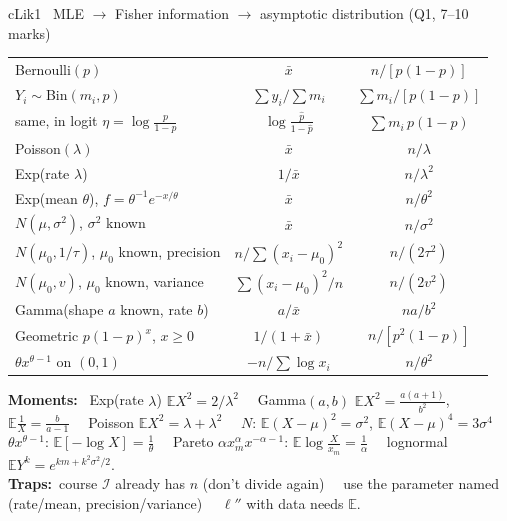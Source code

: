 \documentclass{article}
\newcommand{\h}[1]{{\bfseries #1}\ }
\newcommand{\trap}{{\color{cBay}\textbf{Traps:}}\ }
\newcommand{\E}{\mathbb E}
\newcommand{\I}{\mathcal I}
\newcommand{\sep}{\ \textbullet\ }
\begin{document}
\begin{multicols*}{3}
\begin{tb}{cLik}{1 \textbullet\ MLE $\to$ Fisher information $\to$ asymptotic distribution (Q1, 7--10 marks)}
\begin{tabularx}{\linewidth}{@{}L|c|c@{}}
Bernoulli$(p)$ & $\bar x$ & $n/[p(1-p)]$\\
$Y_i\sim$Bin$(m_i,p)$ & $\sum y_i/\sum m_i$ & $\sum m_i/[p(1-p)]$\\
\quad same, in logit $\eta=\log\frac p{1-p}$ & $\log\frac{\hat p}{1-\hat p}$ & $\sum m_i\,p(1-p)$\\
Poisson$(\lambda)$ & $\bar x$ & $n/\lambda$\\
Exp(rate $\lambda$) & $1/\bar x$ & $n/\lambda^2$\\
Exp(mean $\theta$), $f=\theta^{-1}e^{-x/\theta}$ & $\bar x$ & $n/\theta^2$\\
$N(\mu,\sigma^2)$, $\sigma^2$ known & $\bar x$ & $n/\sigma^2$\\
$N(\mu_0,1/\tau)$, $\mu_0$ known, precision & $n/\sum(x_i-\mu_0)^2$ & $n/(2\tau^2)$\\
$N(\mu_0,v)$, $\mu_0$ known, variance & $\sum(x_i-\mu_0)^2/n$ & $n/(2v^2)$\\
Gamma(shape $a$ known, rate $b$) & $a/\bar x$ & $na/b^2$\\
Geometric $p(1-p)^x$, $x\ge0$ & $1/(1+\bar x)$ & $n/[p^2(1-p)]$\\
$\theta x^{\theta-1}$ on $(0,1)$ & $-n/\sum\log x_i$ & $n/\theta^2$\\
\end{tabularx}
\h{Moments:} Exp(rate $\lambda$) $\E X^2=2/\lambda^2$ \sep Gamma$(a,b)$ $\E X^2=\frac{a(a+1)}{b^2}$, $\E\frac1X=\frac b{a-1}$ \sep Poisson $\E X^2=\lambda+\lambda^2$ \sep $N$: $\E(X-\mu)^2=\sigma^2$, $\E(X-\mu)^4=3\sigma^4$ \sep $\theta x^{\theta-1}$: $\E[-\log X]=\frac1\theta$ \sep Pareto $\alpha x_m^\alpha x^{-\alpha-1}$: $\E\log\frac X{x_m}=\frac1\alpha$ \sep lognormal $\E Y^k=e^{km+k^2\sigma^2/2}$.\\
\trap course $\I$ already has $n$ (don't divide again) \sep use the parameter named (rate/mean, precision/variance) \sep $\ell''$ with data needs $\E$.
\end{tb}


\end{multicols*}
\end{document}
